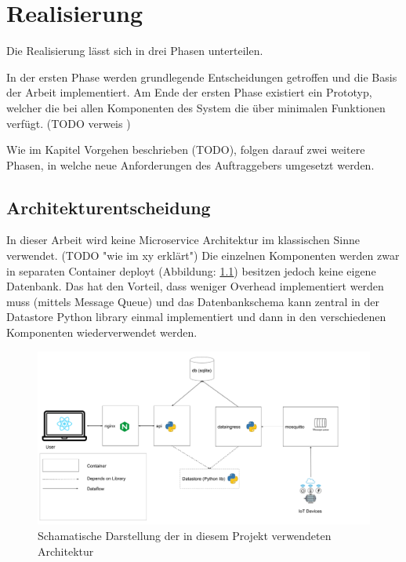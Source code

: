 \chapter{Realisierung}
Die Realisierung lässt sich in drei Phasen unterteilen.

In der ersten Phase werden grundlegende Entscheidungen getroffen und die Basis der Arbeit implementiert.
Am Ende der ersten Phase existiert ein Prototyp, 
welcher die bei allen Komponenten des System die über minimalen Funktionen verfügt. (TODO verweis )

Wie im Kapitel Vorgehen beschrieben (TODO), folgen darauf zwei weitere Phasen,
in welche neue Anforderungen des Auftraggebers umgesetzt werden.


\section{Architekturentscheidung}

In dieser Arbeit wird keine Microservice Architektur im klassischen Sinne verwendet. (TODO "wie im xy erklärt")
Die einzelnen Komponenten werden zwar in separaten Container deployt (Abbildung: \ref{fig:smic-arch})
besitzen jedoch keine eigene Datenbank.
Das hat den Vorteil, dass weniger Overhead implementiert werden muss (mittels Message Queue)
und das Datenbankschema kann zentral in der Datastore Python library einmal implementiert
und dann in den verschiedenen Komponenten wiederverwendet werden.


\begin{figure}[h]
    \centering
    \includegraphics[width=1.0\textwidth]{gfx/smic-arch}
    \caption{
        Schamatische Darstellung der in diesem Projekt verwendeten Architektur
    }
    \label{fig:smic-arch}
\end{figure}

